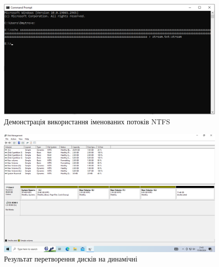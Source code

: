 \documentclass[oneside,14pt]{extarticle}
\begin{document}
\begin{normalsize}
	\begin{figure}[H]
		\centering
		\includegraphics[scale=0.5]{12}
		\caption{Демонстрація використання іменованих потоків NTFS}
	\end{figure}
	
	\begin{figure}[H]
		\centering
		\includegraphics[scale=0.4]{13}
		\caption{Результат перетворення дисків на динамічні}
	\end{figure}
	

\end{normalsize}
\end{document}
